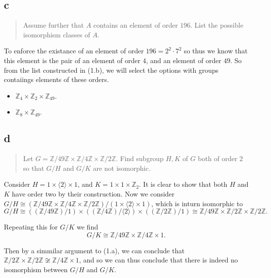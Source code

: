 \hypertarget{c}{%
\subsection{c}\label{c}}

\begin{quote}
Assume further that \(A\) contains an element of order \(196\). List the
possible isomorphism classes of \(A\).
\end{quote}

To enforce the existance of an element of order \(196=2^2\cdot7^2\) so
thus we know that this element is the pair of an element of order \(4\),
and an element of order \(49\). So from the list constructed in (1.b),
we will select the options with groups contaiings elements of these
orders.

\begin{itemize}
\tightlist
\item
  \(\mathbb{Z}_{4}\times\mathbb{Z}_{2}\times\mathbb{Z}_{49}\).
\item
  \(\mathbb{Z}_{8}\times\mathbb{Z}_{49}\).
\end{itemize}

\hypertarget{d}{%
\subsection{d}\label{d}}

\begin{quote}
Let
\(G=\mathbb{Z}/49\mathbb{Z}\times\mathbb{Z}/4\mathbb{Z}\times\mathbb{Z}/2\mathbb{Z}\).
Find subgroup \(H,K\) of \(G\) both of order \(2\) so that \(G/H\) and
\(G/K\) are not isomorphic.
\end{quote}

Consider \(H=1\times\langle 2\rangle\times 1\), and
\(K=1\times 1\times\mathbb{Z}_2\). It is clear to show that both \(H\)
and \(K\) have order two by their construction. Now we consider
\(G/H\cong(\mathbb{Z}/49\mathbb{Z}\times\mathbb{Z}/4\mathbb{Z}\times\mathbb{Z}/2\mathbb{Z})/(1\times\langle 2\rangle\times 1)\),
which is inturn isomorphic to
\[G/H\cong((\mathbb{Z}/49\mathbb{Z})/1)\times((\mathbb{Z}/4\mathbb{Z})/\langle
2\rangle)\times((\mathbb{Z}/2\mathbb{Z})/1)\cong
\mathbb{Z}/49\mathbb{Z}\times\mathbb{Z}/2\mathbb{Z}\times\mathbb{Z}/2\mathbb{Z}.\]

Repeating this for \(G/K\) we find
\[G/K\cong\mathbb{Z}/49\mathbb{Z}\times\mathbb{Z}/4\mathbb{Z}\times 1.\]

Then by a simmilar argument to (1.a), we can conclude that
\(\mathbb{Z}/2\mathbb{Z}\times\mathbb{Z}/2\mathbb{Z}\not\cong\mathbb{Z}/4\mathbb{Z}\times1\),
and so we can thus conclude that there is indeed no isomorphism between
\(G/H\) and \(G/K\).

